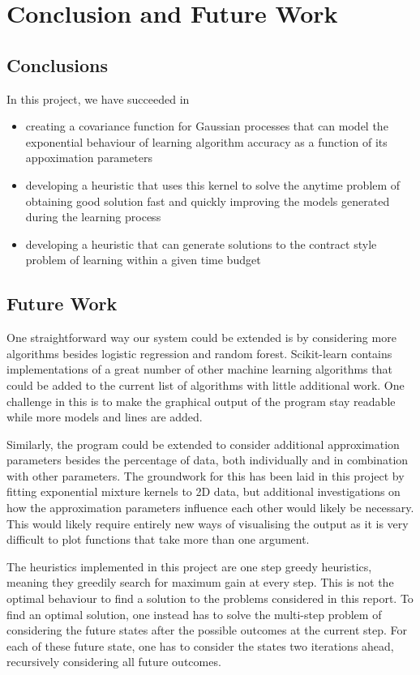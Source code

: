 \documentclass[a4paper,12pt,twoside,openright]{report}
\begin{document}
\chapter{Conclusion and Future Work} 
\section{Conclusions}
In this project, we have succeeded in
\begin{itemize}
	\item creating a covariance function for Gaussian processes that can model the exponential behaviour of learning algorithm accuracy as a function of its appoximation parameters
	\item developing a heuristic that uses this kernel to solve the anytime problem of obtaining good solution fast and quickly improving the models generated during the learning process
	\item developing a heuristic that can generate solutions to the contract style problem of learning within a given time budget
\end{itemize}




\section{Future Work}
One straightforward way our system could be extended is by considering more algorithms besides logistic regression and random forest. Scikit-learn contains implementations of a great number of other machine learning algorithms that could be added to the current list of algorithms with little additional work. One challenge in this is to make the graphical output of the program stay readable while more models and lines are added.

Similarly, the program could be extended to consider additional approximation parameters besides the percentage of data, both individually and in combination with other parameters. The groundwork for this has been laid in this project by fitting exponential mixture kernels to 2D data, but additional investigations on how the approximation parameters influence each other would likely be necessary. This would likely require entirely new ways of visualising the output as it is very difficult to plot functions that take more than one argument.

The heuristics implemented in this project are one step greedy heuristics, meaning they greedily search for maximum gain at every step. This is not the optimal behaviour to find a solution to the problems considered in this report. To find an optimal solution, one instead has to solve the multi-step problem of considering the future states after the possible outcomes at the current step. For each of these future state, one has to consider the states two iterations ahead, recursively considering all future outcomes.
\end{document}
